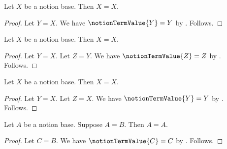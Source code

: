 

\begin{proposition}\label{notion_alias_direct}
    Let $X$ be a notion base.
    Then $X=X$.
\end{proposition}
\begin{proof}
    Let $Y=X$.
    We have $\notionTermValue{Y}=Y$ by .
    Follows.
\end{proof}

\begin{proposition}\label{notion_alias_chain}
    Let $X$ be a notion base.
    Then $X=X$.
\end{proposition}
\begin{proof}
    Let $Y=X$.
    Let $Z=Y$.
    We have $\notionTermValue{Z}=Z$ by .
    Follows.
\end{proof}

\begin{proposition}\label{notion_alias_rebased}
    Let $X$ be a notion base.
    Then $X=X$.
\end{proposition}
\begin{proof}
    Let $Y=X$.
    Let $Z=X$.
    We have $\notionTermValue{Y}=Y$ by .
    Follows.
\end{proof}

\begin{proposition}\label{notion_alias_with_equality}
    Let $A$ be a notion base.
    Suppose $A=B$.
    Then $A=A$.
\end{proposition}
\begin{proof}
    Let $C=B$.
    We have $\notionTermValue{C}=C$ by .
    Follows.
\end{proof}
